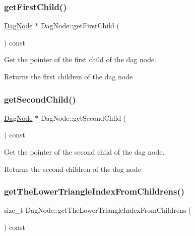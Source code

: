\subsubsection{\texorpdfstring{get\+First\+Child()}{getFirstChild()}}
{\footnotesize\ttfamily \hyperlink{classDagNode}{Dag\+Node} $\ast$ Dag\+Node\+::get\+First\+Child (\begin{DoxyParamCaption}{ }\end{DoxyParamCaption}) const\hspace{0.3cm}{\ttfamily [inline]}}



Get the pointer of the first child of the dag node. 

\begin{DoxyReturn}{Returns}
the first children of the dag node 
\end{DoxyReturn}
\mbox{\label{classDagNode_a301eaa7093739ce7892020a2a4c32cfd}} 
\subsubsection{\texorpdfstring{get\+Second\+Child()}{getSecondChild()}}
{\footnotesize\ttfamily \hyperlink{classDagNode}{Dag\+Node} $\ast$ Dag\+Node\+::get\+Second\+Child (\begin{DoxyParamCaption}{ }\end{DoxyParamCaption}) const\hspace{0.3cm}{\ttfamily [inline]}}



Get the pointer of the second child of the dag node. 

\begin{DoxyReturn}{Returns}
the second children of the dag node 
\end{DoxyReturn}
\mbox{\label{classDagNode_afd0111a6b8b906c0ac68914436f2db0d}} 
\subsubsection{\texorpdfstring{get\+The\+Lower\+Triangle\+Index\+From\+Childrens()}{getTheLowerTriangleIndexFromChildrens()}}
{\footnotesize\ttfamily size\+\_\+t Dag\+Node\+::get\+The\+Lower\+Triangle\+Index\+From\+Childrens (\begin{DoxyParamCaption}{ }\end{DoxyParamCaption}) const\hspace{0.3cm}{\ttfamily [inline]}}



